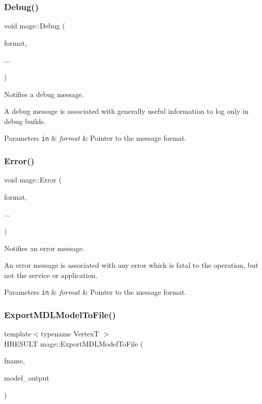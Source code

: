 \subsubsection{\texorpdfstring{Debug()}{Debug()}}
{\footnotesize\ttfamily void mage\+::\+Debug (\begin{DoxyParamCaption}\item[{const char $\ast$}]{format,  }\item[{}]{... }\end{DoxyParamCaption})}

Notifies a debug message.

A debug message is associated with generally useful information to log only in debug builds.


\begin{DoxyParams}[1]{Parameters}
\mbox{\tt in}  & {\em format} & Pointer to the message format. \\
\hline
\end{DoxyParams}
\hypertarget{namespacemage_a52a7fe8c9ce39afd9e0b0299373db0fa}{}\label{namespacemage_a52a7fe8c9ce39afd9e0b0299373db0fa} 
\subsubsection{\texorpdfstring{Error()}{Error()}}
{\footnotesize\ttfamily void mage\+::\+Error (\begin{DoxyParamCaption}\item[{const char $\ast$}]{format,  }\item[{}]{... }\end{DoxyParamCaption})}

Notifies an error message.

An error message is associated with any error which is fatal to the operation, but not the service or application.


\begin{DoxyParams}[1]{Parameters}
\mbox{\tt in}  & {\em format} & Pointer to the message format. \\
\hline
\end{DoxyParams}
\hypertarget{namespacemage_a111dc6972bce8645df185fa5a65f9bff}{}\label{namespacemage_a111dc6972bce8645df185fa5a65f9bff} 
\subsubsection{\texorpdfstring{Export\+M\+D\+L\+Model\+To\+File()}{ExportMDLModelToFile()}}
{\footnotesize\ttfamily template$<$typename VertexT $>$ \\
H\+R\+E\+S\+U\+LT mage\+::\+Export\+M\+D\+L\+Model\+To\+File (\begin{DoxyParamCaption}\item[{const wstring \&}]{fname,  }\item[{const \hyperlink{structmage_1_1_model_output}{Model\+Output}$<$ VertexT $>$ \&}]{model\+\_\+output }\end{DoxyParamCaption})}

